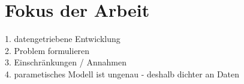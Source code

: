 \section{Fokus der Arbeit}
1. datengetriebene Entwicklung \\
2. Problem formulieren\\
3. Einschränkungen / Annahmen \\
4. parametisches Modell ist ungenau - deshalb dichter an Daten\\


\begin{deprecated}
\cite{davis93}


\end{deprecated}
